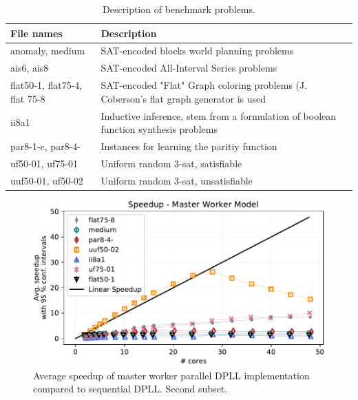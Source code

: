 \documentclass[letterpaper]{article}
\begin{document}
\begin{table}[h]
    \centering
    \begin{tabularx}{\columnwidth}{|p{2.6cm}|X|}
        \hline
        File names & Description\\
        \hline
        \hline
        anomaly, medium & SAT-encoded blocks world planning problems\\
        \hline
        ais6, ais8 & SAT-encoded All-Interval Series problems\\
        \hline
        flat50-1, flat75-4, flat 75-8 & SAT-encoded "Flat" Graph coloring problems (J. Coberson's flat graph generator is used\\
        \hline
        ii8a1 & Inductive inference, stem from a formulation of boolean function synthesis problems\\
        \hline
        par8-1-c, par8-4- & Instances for learning the paritiy function\\
        \hline
        uf50-01, uf75-01 & Uniform random 3-sat, satisfiable\\
        \hline
        uuf50-01, uf50-02 & Uniform random 3-sat, unsatisfiable\\
        \hline
    \end{tabularx}
    \caption{Description of benchmark problems.}
    \label{tab:benchmark_set}
\end{table}


\begin{figure}[p]
    \centering
    \includegraphics[width=\columnwidth]{figures/scaling_parallel_non_subset_dpll_scaling_tar.pdf}
    \caption{Average speedup of master worker parallel DPLL implementation compared to sequential DPLL.
    Second subset.}
    \label{fig:dpll_parallel_speedup_non}
\end{figure}
\end{document}
